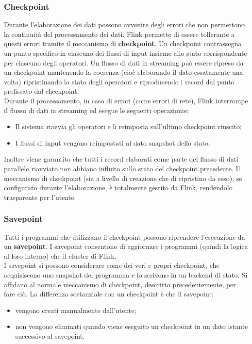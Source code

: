 {\subsubsection{Checkpoint}
Durante l'elaborazione dei dati possono avvenire degli errori che non permettono la continuità del processamento dei dati. Flink permette di essere tollerante a questi errori tramite il meccanismo di \textbf{checkpoint}. Un checkpoint contrassegna un punto specifico in ciascuno dei flussi di input insieme allo stato corrispondente per ciascuno degli operatori. Un flusso di dati in streaming può essere ripreso da un checkpoint mantenendo la coerenza (cioè elaborando il dato essatamente una volta) ripristinando lo stato degli operatori e riproducendo i record dal punto prefissato dal checkpoint.\\
Durante il processamento, in caso di errori (come errori di rete), Flink interrompe il flusso di dati in streaming ed esegue le seguenti operazionie:
\begin{itemize}
	\item{Il sistema riavvia gli operatori e li reimposta sull'ultimo checkpoint riuscito;}
	\item{I flussi di input vengono reimpostati al dato \gls{snapshot} dello stato.}
\end{itemize}
Inoltre viene garantito che tutti i record elaborati come parte del flusso di dati parallelo riavviato non abbiano influito sullo stato del checkpoint precedente.
Il meccanismo di checkpoint (sia a livello di creazione che di ripristino da esso), se configurato durante l'elaborazione, è totalmente gestito da Flink, rendendolo trasparente per l'utente.

\subsubsection{Savepoint}
Tutti i programmi che utilizzano il checkpoint possono riprendere l'esecuzione da un \textbf{savepoint}. I savepoint  consentono di aggiornare i programmi (quindi la logica al loro interno) che il \gls{cluster} di Flink.\\
I savepoint si possono considerare come dei veri e propri checkpoint, che acquisiscono uno \gls{snapshot} del programma e lo scrivono in un backend di stato. Si affidano al normale meccanismo di checkpoint, descritto precedentemente, per fare ciò. La differenza sostanziale con un checkpoint è che il savepoint:
\begin{itemize}
	\item{vengono creati manualmente dall'utente;}
	\item{non vengono eliminati quando viene eseguito un checkpoint in un dato istante successivo al savepoint.}
\end{itemize}


}
